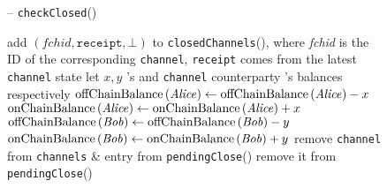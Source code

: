   \begin{figure}[H]
    \begin{systembox}{\fpaynet{} -- \texttt{checkClosed}()}
      \begin{algorithmic}[1]
         
        \label{alg:fpaynet:close:func:start}
          \label{alg:fpaynet:close:func:ifunnotified}
            \State add $(\mathit{fchid}, \mathtt{receipt}, \bot)$ to
            \texttt{closedChannels}(\alice), where \textit{fchid} is the ID of
            the corresponding \texttt{channel}, \texttt{receipt} comes from the
            latest \texttt{channel} state
            \label{alg:fpaynet:close:func:unnotified}
          \EndIf
            \label{alg:fpaynet:close:func:happy:start}
              \State let $x, y$ \alice{}'s and \texttt{channel} counterparty
              \bob{}'s balances respectively
              \State $\mathrm{offChainBalance}\left(\mathit{Alice}\right) \gets
              \mathrm{offChainBalance}\left(\mathit{Alice}\right) - x$
              \State $\mathrm{onChainBalance}\left(\mathit{Alice}\right) \gets
              \mathrm{onChainBalance}\left(\mathit{Alice}\right) + x$
              \label{alg:fpaynet:close:func:alice:credit}
              \State $\mathrm{offChainBalance}\left(\mathit{Bob}\right) \gets
              \mathrm{offChainBalance}\left(\mathit{Bob}\right) - y$
              \State $\mathrm{onChainBalance}\left(\mathit{Bob}\right) \gets
              \mathrm{onChainBalance}\left(\mathit{Bob}\right) + y$
              \label{alg:fpaynet:close:func:bob:credit}
              \State remove \texttt{channel} from \texttt{channels} \& entry
              from \texttt{pendingClose}(\alice)
                \State remove it from \texttt{pendingClose}(\bob)
              \EndIf
              \label{alg:fpaynet:close:func:happy:end}
\end{algorithmic}
\end{systembox}
\end{figure}

